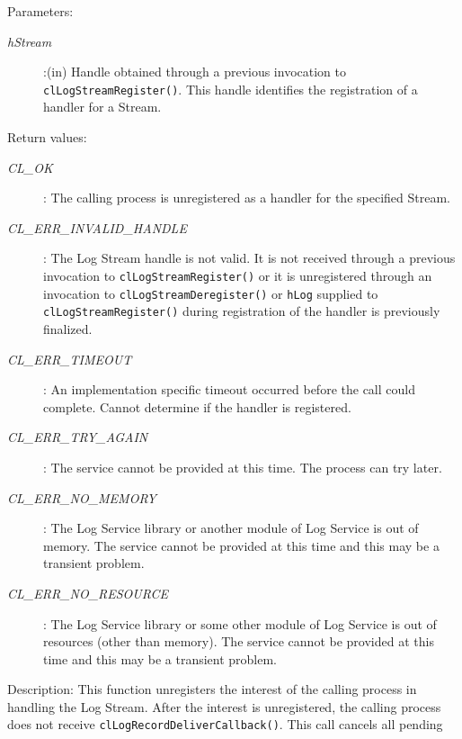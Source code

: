\begin{flushleft}
\begin{Desc}
\begin{verbatim}
\end{verbatim}
\normalsize
\end{Desc}
\begin{Desc}
\item[Parameters:] \begin{description}
\item[{\em hStream}]:(in) Handle obtained through a previous invocation to {\tt{clLogStreamRegister()}}. This handle identifies the registration of 
a handler for a Stream.
\end{description}
\end{Desc}
\begin{Desc}
\item[Return values:]
\begin{description}
\item[{\em CL\_\-OK}]: The calling process is unregistered as a handler for the specified Stream.
\item[{\em CL\_\-ERR\_\-INVALID\_\-HANDLE}]: The Log Stream handle is not valid. It is not received through a previous invocation to 
{\tt{clLogStreamRegister()}} or it is unregistered through an invocation to {\tt{clLogStreamDeregister()}} or 
{\tt{hLog}} supplied to {\tt{clLogStreamRegister()}} during registration of the handler is previously finalized.
\item[{\em CL\_\-ERR\_\-TIMEOUT}]: An implementation specific timeout occurred before the call could complete. Cannot determine if the
handler is registered.
\item[{\em CL\_\-ERR\_\-TRY\_\-AGAIN}]: The service cannot be provided at this time. The process can try later.
\item[{\em CL\_\-ERR\_\-NO\_\-MEMORY}]: The Log Service library or another module of Log Service is out of memory. The service cannot 
be provided at this time and this may be a transient problem.
\item[{\em CL\_\-ERR\_\-NO\_\-RESOURCE}]: The Log Service library or some other module of Log Service is out of resources 
(other than memory). The service cannot be provided at this time and this may be a transient problem.
\end{description}
\end{Desc}
\begin{Desc}
\item[Description:] This function unregisters the interest of the calling process in handling the Log Stream. After the interest is unregistered, 
the calling process does not receive {\tt{clLogRecordDeliverCallback()}}. This call cancels all pending 

\end{Desc}
\end{flushleft}
